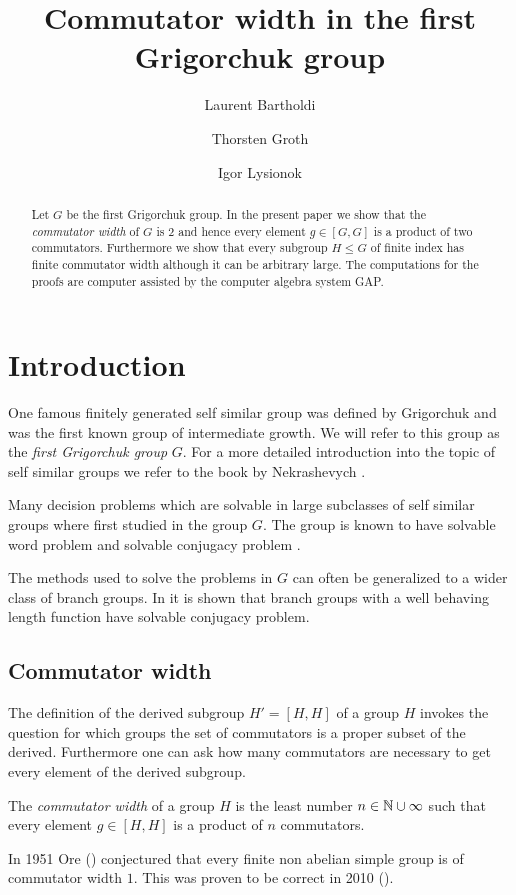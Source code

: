 \documentclass[a4paper,11pt]{amsart}
\begin{document}
\title{Commutator width in the first Grigorchuk group}
\author{Laurent Bartholdi}
\author{Thorsten Groth}
\author{Igor Lysionok}
\begin{abstract}
Let $G$ be the first Grigorchuk group. 
In the present paper we show that the \emph{commutator width}
of $G$ is $2$ and hence every element $g\in [G,G]$ is a product
of two commutators. Furthermore we show that every subgroup $H\leq G$ 
of finite index has finite commutator width
although it can be arbitrary large. %
The computations for the proofs are computer assisted by the
computer algebra system GAP.
\end{abstract}
\maketitle

\section{Introduction}
One famous finitely generated self similar group 
was defined by Grigorchuk and was the first known group of intermediate growth.
We will refer to this group as the \emph{first Grigorchuk group} $G$.
For a more detailed introduction into the topic of self similar
groups we refer to the book by Nekrashevych \cite{Nekrashevych:SelfSimilarGroups}. 

Many decision problems which are solvable in large subclasses of 
self similar groups where first studied in the group $G$. The group
is known to have solvable word problem and solvable conjugacy problem
\cite{Leonov:Conjugacy-alg.-Grig-group,Rozhkov:Conjugacy-alg.-Grig-group}.

The methods used to solve the problems in $G$ can often be generalized 
to a wider class of branch groups. In
\cite{GrigorchukWilson:CP_for_certain_branch_groups} it is shown that
branch groups with a well behaving length function have solvable 
conjugacy problem.

\subsection{Commutator width}
The definition of the derived subgroup $H'=[H,H]$ of a group $H$ invokes 
the question for which groups the set of commutators is a proper subset
of the derived. 
Furthermore one can ask how many commutators are necessary to get every 
element of the derived subgroup.
\begin{defi}
 The \emph{commutator width} of a group $H$ is the least number $n\in \mathbb{N}\cup \infty$ such
 that every element $g\in [H,H]$ is a product of $n$ commutators.
\end{defi}
In 1951 Ore (\cite{Ore:Commutators}) conjectured that every finite non abelian simple group is 
of commutator width $1$. This was proven to be correct in 2010 (\cite{Liebeck:OreConjecture}).
\end{document}
